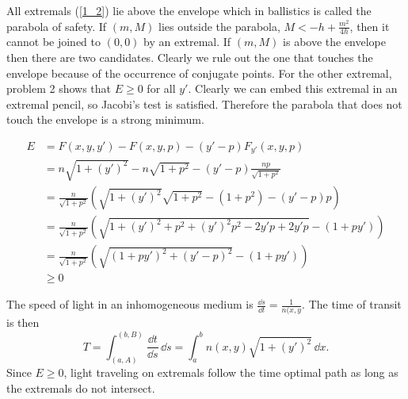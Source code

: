\begin{Solution}
  All extremals (\ref{1_2}) lie above the envelope which in ballistics is
  called the parabola of safety.  If $(m,M)$ lies outside the parabola,
  $M < -h + \frac{m^2}{4h}$, then it cannot be joined to $(0,0)$ by
  an extremal.  If $(m,M)$ is above the envelope then there are two candidates.
  Clearly we rule out the one that touches the envelope because of the
  occurrence of conjugate points.  For the other extremal, problem 2 
  shows that $E \geq 0$ for all $y'$.  Clearly we can embed this extremal in
  an extremal pencil, so Jacobi's test is satisfied.  Therefore the
  parabola that does not touch the envelope is a strong minimum.
\end{Solution}



\begin{Solution}
  \begin{align*}
    E       &= F(x,y,y') - F(x,y,p) - (y'-p) F_{y'}(x,y,p) \\
    &= n \sqrt{1+(y')^2} - n \sqrt{1 + p^2} - (y'-p) 
    \frac{ n p }{ \sqrt{1 + p^2} } \\
    &= \frac{n}{\sqrt{1+p^2}} \left( \sqrt{1+(y')^2} \sqrt{1+p^2}
      - (1+p^2) - (y'-p)p \right) \\
    &= \frac{n}{\sqrt{1+p^2}} \left( \sqrt{ 1 + (y')^2 + p^2 + (y')^2 p^2
        - 2 y' p + 2 y' p } - (1 + p y' ) \right) \\
    &= \frac{n}{\sqrt{1+p^2}} \left( \sqrt{ (1+p y')^2 + (y'-p)^2 }
      - (1 + p y' ) \right) \\
    &\geq 0
  \end{align*}


  The speed of light in an inhomogeneous medium is 
  $\frac{\dd s}{\dd t} = \frac{1}{n(x,y}$.  The time of transit is then
  \[
  T = \int_{(a,A)}^{(b,B)} \frac{\dd t}{\dd s} \,\dd s 
  = \int_a^b n(x,y) \sqrt{1 + (y')^2} \,\dd x.
  \]
  Since $E \geq 0$, light traveling on extremals follow the time optimal path
  as long as the extremals do not intersect.
\end{Solution}



